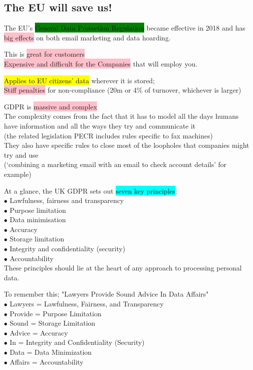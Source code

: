\documentclass[tikz,border=10pt]{project_plan}
\newcommand{\bulletPoint}{\hspace{-3.1pt}$\bullet$ \hspace{5pt}}
\begin{document}
\subsection{The EU will save us!}

The EU’s \colorbox{green}{General Data Protection Regulation} became effective in 2018 and has
\colorbox{pink}{big effects} on both email marketing and data hoarding.

This is \colorbox{pink}{great for customers}\\
\colorbox{pink}{Expensive and difficult for the Companies} that will employ you.

\colorbox{yellow}{Applies to EU citizens’ data} wherever it is stored;\\
\colorbox{pink}{Stiff penalties} for non-compliance (\EUR 20m or 4\% of turnover, whichever is larger)

GDPR is \colorbox{pink}{massive and complex}\\
The complexity comes from the fact that it has to model all the days humans have
information and all the ways they try and communicate it \\
(the related legislation PECR includes rules specific to fax machines) \\
They also have specific rules to close most of the loopholes that companies might try and use\\
(‘combining a marketing email with an email to check account details’ for example)

At a glance, the UK GDPR sets out \colorbox{cyan}{seven key principles}: \\
\bulletPoint Lawfulness, fairness and transparency\\
\bulletPoint Purpose limitation\\
\bulletPoint Data minimisation\\
\bulletPoint Accuracy\\
\bulletPoint Storage limitation\\
\bulletPoint Integrity and confidentiality (security)\\
\bulletPoint Accountability\\
These principles should lie at the heart of any approach to processing personal data.

To remember this; "Lawyers Provide Sound Advice In Data Affairs"\\
\bulletPoint  Lawyers = Lawfulness, Fairness, and Transparency\\
\bulletPoint  Provide = Purpose Limitation\\
\bulletPoint  Sound = Storage Limitation\\
\bulletPoint  Advice = Accuracy\\
\bulletPoint  In = Integrity and Confidentiality (Security)\\
\bulletPoint  Data = Data Minimization\\
\bulletPoint  Affairs = Accountability
\end{document}
